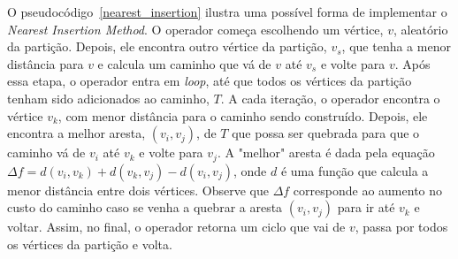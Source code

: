 O pseudocódigo~\ref{nearest_insertion} ilustra uma possível forma de implementar 
o \textit{Nearest Insertion Method}. O operador começa escolhendo um vértice, 
$v$, aleatório da partição. Depois, ele encontra outro vértice da partição, 
$v_{s}$,  que tenha a menor distância para $v$ e calcula um caminho que vá de $v$ 
até $v_{s}$ e volte para $v$. Após essa etapa, o operador entra em 
\textit{loop}, até que todos os vértices da partição tenham sido adicionados ao 
caminho, $T$. A cada iteração, o operador encontra o vértice $v_{k}$, com menor 
distância para o caminho sendo construído. Depois, ele encontra a melhor aresta, 
$(v_{i}, v_{j})$, de $T$ que possa ser quebrada para que o caminho vá de $v_{i}$ 
até $v_{k}$ e volte para $v_{j}$. A "melhor" aresta é dada pela equação 
$\Delta f = d(v_{i}, v_{k}) + d(v_{k}, v_{j}) - d(v_{i}, v_{j})$, onde $d$ é uma 
função que calcula a menor distância entre dois vértices.  Observe que 
$\Delta f$ corresponde ao aumento no custo do caminho caso se venha a quebrar a 
aresta $(v_{i}, v_{j})$ para ir até $v_{k}$ e voltar. Assim, no final, o 
operador retorna um ciclo que vai de $v$, passa por todos os vértices da 
partição e volta.

